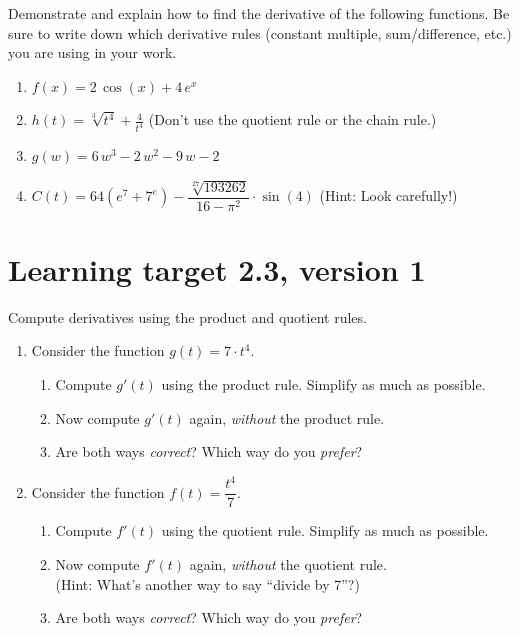Demonstrate and explain how to find the derivative of the following functions. Be sure to write down which derivative rules (constant multiple, sum/difference, etc.) you are using in your work.

\begin{enumerate}
    \item \(f(x) = 2 \, \cos\left(x\right) + 4 \, e^{x}\) 
    \vfill
    \item \(h(t) = \sqrt[3]{t^4} + \frac{4}{t^{4}}\) \quad (Don't use the quotient rule or the chain rule.)
    \vfill
    \item \(g(w) = 6 \, w^{3} - 2 \, w^{2} - 9 \, w - 2\)
    \vfill
    \item \(C(t) = 64(e^7 + 7^e)- \dfrac{\sqrt[27]{193262}}{16-\pi^2}\cdot\sin(4)\) \quad
(Hint: Look carefully!)
\end{enumerate}

\pagebreak

\section{Learning target 2.3, version 1}

Compute derivatives using the product and quotient rules.

\hrulefill

\begin{enumerate}[leftmargin=15pt]
    \item Consider the function $g(t) = 7\cdot t^4$.
    \begin{enumerate}
        \item Compute $g'(t)$ using the product rule. Simplify as much as possible.
        \vfill
        \item Now compute $g'(t)$ again, \textit{without} the product rule.
        \vfill
        \item Are both ways \textit{correct}? Which way do you \textit{prefer}?
        \vfill
    \end{enumerate}
    \item Consider the function $f(t) = \dfrac{t^4}{7}$. 

    \begin{enumerate}
        \item Compute $f'(t)$ using the quotient rule. Simplify as much as possible.
        \vfill
        \item Now compute $f'(t)$ again, \textit{without} the quotient rule.\\
        (Hint: What's another way to say ``divide by 7''?)
        \vfill
        \item Are both ways \textit{correct}? Which way do you \textit{prefer}?
    \end{enumerate}
\end{enumerate}

